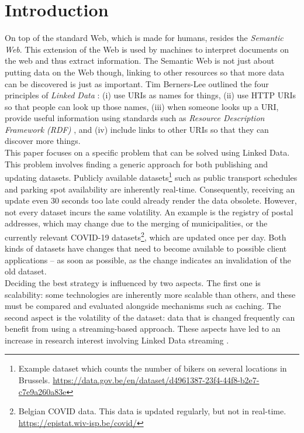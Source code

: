 \section{Introduction}\label{sec:introduction}

On top of the standard Web, which is made for humans, resides the \emph{Semantic Web}. This extension of the Web is used by machines to interpret documents on the web and thus extract information. The Semantic Web is not just about putting data on the Web though, linking to other resources so that more data can be discovered is just as important. Tim Berners-Lee outlined the four principles of \emph{Linked Data} \cite{bizer2011linked}: (i) use URIs as names for things, (ii) use HTTP URIs so that people can look up those names, (iii) when someone looks up a URI, provide useful information using standards such as \emph{Resource Description Framework (RDF)} \cite{lassila1998resource}, and (iv) include links to other URIs so that they can discover more things.\\

\noindent This paper focuses on a specific problem that can be solved using Linked Data. This problem involves finding a generic approach for both publishing and updating datasets. Publicly available datasets\footnote{Example dataset which counts the number of bikers on several locations in Brussels. \url{https://data.gov.be/en/dataset/d4961387-23f4-44f8-b2e7-c7e9a260a83e}} such as public transport schedules and parking spot availability are inherently real-time. Consequently, receiving an update even 30 seconds too late could already render the data obsolete. However, not every dataset incurs the same volatility. An example is the registry of postal addresses, which may change due to the merging of municipalities, or the currently relevant COVID-19 datasets\footnote{Belgian COVID data. This data is updated regularly, but not in real-time. \url{https://epistat.wiv-isp.be/covid/}}, which are updated once per day. Both kinds of datasets have changes that need to become available to possible client applications -- as soon as possible, as the change indicates an invalidation of the old dataset.\\

\noindent Deciding the best strategy is influenced by two aspects. The first one is scalability: some technologies are inherently more scalable than others, and these must be compared and evaluated alongside mechanisms such as caching. The second aspect is the volatility of the dataset: data that is changed frequently can benefit from using a streaming-based approach. These aspects have led to an increase in research interest involving Linked Data streaming \cite{phuoc2012}.\\

